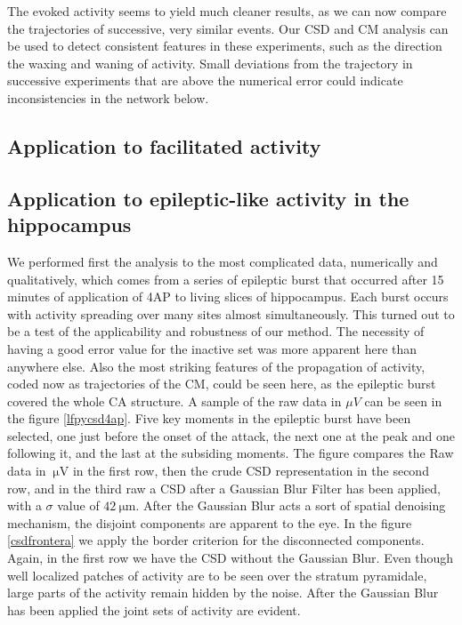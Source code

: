 \documentclass[12pt]{article}
\newcommand{\mum}[1]{\SI{#1}{\micro\metre}}
\newcommand{\muV}[1]{\SI{#1}{\micro\volt}}
\begin{document}
The evoked activity seems to yield much cleaner results, as we can now compare the trajectories of successive, very similar events. Our CSD and CM analysis can be used to detect consistent features in these experiments, such as the direction the waxing and waning of activity. Small deviations from the trajectory in successive experiments that are above the numerical error could indicate inconsistencies in the network below. 

\subsection{Application to facilitated activity}


\subsection{Application to epileptic-like activity in the hippocampus}
We performed first the analysis to the most complicated data, numerically and qualitatively, which comes from a series of epileptic burst that occurred after 15 minutes of application of 4AP to living slices of hippocampus. Each burst occurs with activity spreading over many sites almost simultaneously. This turned out to be a test of the applicability and robustness of our method. The necessity of having a good error value for the inactive set was more apparent here than anywhere else. Also the most striking features of the propagation of activity, coded now as trajectories of the CM, could be seen here, as the epileptic burst covered the whole CA structure. A sample of the raw data in $\mu V$ can be seen in the figure \ref{lfpycsd4ap}. Five key moments in the epileptic burst have been selected, one just before the onset of the attack, the next one at the peak and one  following it, and the last at the subsiding moments. The figure compares the Raw data
in $\muV{}$ in the first row, then the crude CSD representation in the second row, and
in the third raw a CSD after a Gaussian Blur Filter has been applied,
with a $\sigma$ value of $ \mum{42}$. After the Gaussian Blur acts a sort of
spatial denoising mechanism, the disjoint components are apparent to the eye.
In the figure \ref{csdfrontera} we apply the border criterion for the disconnected
components. Again, in the first row we have the CSD without the Gaussian Blur.
Even though well localized patches of activity are to be seen over the
stratum pyramidale, large parts of the activity remain hidden by the noise.
After the Gaussian Blur has been applied the joint sets of activity are evident. 
\end{document}
